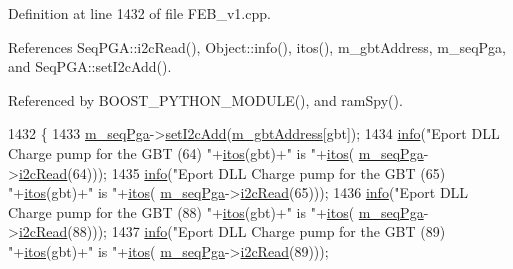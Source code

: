 Definition at line 1432 of file F\+E\+B\+\_\+v1.\+cpp.



References Seq\+P\+G\+A\+::i2c\+Read(), Object\+::info(), itos(), m\+\_\+gbt\+Address, m\+\_\+seq\+Pga, and Seq\+P\+G\+A\+::set\+I2c\+Add().



Referenced by B\+O\+O\+S\+T\+\_\+\+P\+Y\+T\+H\+O\+N\+\_\+\+M\+O\+D\+U\+L\+E(), and ram\+Spy().


\begin{DoxyCode}
1432                                  \{
1433   \hyperlink{classFEB__v1_a6c7804ac86796f233a8393043adf2e77}{m\_seqPga}->\hyperlink{classSeqPGA_a4ef334e4d2cb417b49033dce951728cd}{setI2cAdd}(\hyperlink{classFEB__v1_ac625855df976f16694178f1a4c0eef1e}{m\_gbtAddress}[gbt]);
1434   \hyperlink{classObject_a644fd329ea4cb85f54fa6846484b84a8}{info}(\textcolor{stringliteral}{"Eport DLL Charge pump for the GBT (64)  "}+\hyperlink{Tools_8h_af330027dbdafb9a30768b3613c553e60}{itos}(gbt)+\textcolor{stringliteral}{" is "}+\hyperlink{Tools_8h_af330027dbdafb9a30768b3613c553e60}{itos}(
      \hyperlink{classFEB__v1_a6c7804ac86796f233a8393043adf2e77}{m\_seqPga}->\hyperlink{classSeqPGA_a7cd344df2be99f3a02b487f80e87b27e}{i2cRead}(64)));
1435   \hyperlink{classObject_a644fd329ea4cb85f54fa6846484b84a8}{info}(\textcolor{stringliteral}{"Eport DLL Charge pump for the GBT (65)  "}+\hyperlink{Tools_8h_af330027dbdafb9a30768b3613c553e60}{itos}(gbt)+\textcolor{stringliteral}{" is "}+\hyperlink{Tools_8h_af330027dbdafb9a30768b3613c553e60}{itos}(
      \hyperlink{classFEB__v1_a6c7804ac86796f233a8393043adf2e77}{m\_seqPga}->\hyperlink{classSeqPGA_a7cd344df2be99f3a02b487f80e87b27e}{i2cRead}(65)));
1436   \hyperlink{classObject_a644fd329ea4cb85f54fa6846484b84a8}{info}(\textcolor{stringliteral}{"Eport DLL Charge pump for the GBT (88)  "}+\hyperlink{Tools_8h_af330027dbdafb9a30768b3613c553e60}{itos}(gbt)+\textcolor{stringliteral}{" is "}+\hyperlink{Tools_8h_af330027dbdafb9a30768b3613c553e60}{itos}(
      \hyperlink{classFEB__v1_a6c7804ac86796f233a8393043adf2e77}{m\_seqPga}->\hyperlink{classSeqPGA_a7cd344df2be99f3a02b487f80e87b27e}{i2cRead}(88)));
1437   \hyperlink{classObject_a644fd329ea4cb85f54fa6846484b84a8}{info}(\textcolor{stringliteral}{"Eport DLL Charge pump for the GBT (89)  "}+\hyperlink{Tools_8h_af330027dbdafb9a30768b3613c553e60}{itos}(gbt)+\textcolor{stringliteral}{" is "}+\hyperlink{Tools_8h_af330027dbdafb9a30768b3613c553e60}{itos}(
      \hyperlink{classFEB__v1_a6c7804ac86796f233a8393043adf2e77}{m\_seqPga}->\hyperlink{classSeqPGA_a7cd344df2be99f3a02b487f80e87b27e}{i2cRead}(89)));

\end{DoxyCode}
